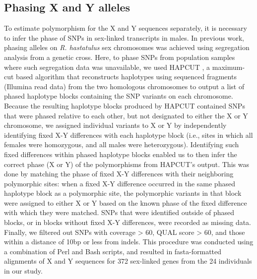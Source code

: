 \documentclass[9pt,twocolumn,twoside]{gsajnl}
\begin{document}
\subsection*{Phasing X and Y alleles}
To estimate polymorphism for the X and Y sequences separately, it is necessary to infer the phase of SNPs in sex-linked transcripts in males. In previous work, phasing alleles on \textit{R. hastatulus} sex chromosomes was achieved using segregation analysis from a genetic cross. Here, to phase SNPs from population samples where such segregation data was unavailable, we used HAPCUT \citep{bansal2008hapcut}, a maximum-cut based algorithm that reconstructs haplotypes using sequenced fragments (Illumina read data) from the two homologous chromosomes to output a list of phased haplotype blocks containing the SNP variants on each chromosome. Because the resulting haplotype blocks produced by HAPCUT contained SNPs that were phased relative to each other, but not designated to either the X or Y chromosome, we assigned individual variants to X or Y by independently identifying fixed X-Y differences with each haplotype block (i.e., sites in which all females were homozygous, and all males were heterozygous). Identifying such fixed differences within phased haplotype blocks enabled us to then infer the correct phase (X or Y) of the polymorphisms from HAPCUT’s output. This was done by matching the phase of fixed X-Y differences with their neighboring polymorphic sites: when a fixed X-Y difference occurred in the same phased haplotype block as a polymorphic site, the polymorphic variants in that block were assigned to either X or Y based on the known phase of the fixed difference with which they were matched. SNPs that were identified outside of phased blocks, or in blocks without fixed X-Y differences, were recorded as missing data. Finally, we filtered out SNPs with coverage > 60, QUAL score > 60, and those within a distance of 10bp or less from indels. This procedure was conducted using a combination of Perl and Bash scripts, and resulted in fasta-formatted alignments of X and Y sequences for 372 sex-linked genes from the 24 individuals in our study.
\end{document}
